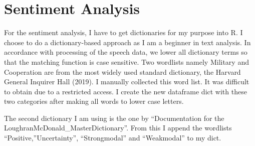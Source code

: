 \documentclass[
]{article}
\newenvironment{Shaded}{\begin{snugshade}}{\end{snugshade}}
\newcommand{\CommentTok}[1]{\textcolor[rgb]{0.56,0.35,0.01}{\textit{#1}}}
\newcommand{\ErrorTok}[1]{\textcolor[rgb]{0.64,0.00,0.00}{\textbf{#1}}}
\newcommand{\FunctionTok}[1]{\textcolor[rgb]{0.00,0.00,0.00}{#1}}
\newcommand{\NormalTok}[1]{#1}
\newcommand{\OtherTok}[1]{\textcolor[rgb]{0.56,0.35,0.01}{#1}}
\newcommand{\SpecialCharTok}[1]{\textcolor[rgb]{0.00,0.00,0.00}{#1}}
\newcommand{\StringTok}[1]{\textcolor[rgb]{0.31,0.60,0.02}{#1}}
\begin{document}
\hypertarget{sentiment-analysis}{%
\section{Sentiment Analysis}\label{sentiment-analysis}}

For the sentiment analysis, I have to get dictionaries for my purpose
into R. I choose to do a dictionary-based approach as I am a beginner in
text analysis. In accordance with processing of the speech data, we
lower all dictionary terms so that the matching function is case
sensitive. Two wordlists namely Military and Cooperation are from the
most widely used standard dictionary, the Harvard General Inquirer Hall
(2019). I manually collected this word list. It was difficult to obtain
due to a restricted access. I create the new dataframe dict with these
two categories after making all words to lower case letters.

\begin{Shaded}
\end{Shaded}

The second dictionary I am using is the one by {``Documentation for the
LoughranMcDonald\_MasterDictionary''}. From this I append the wordlists
``Positive,''Uncertainty'', ``Strongmodal'' and ``Weakmodal'' to my
dict.
\end{document}
